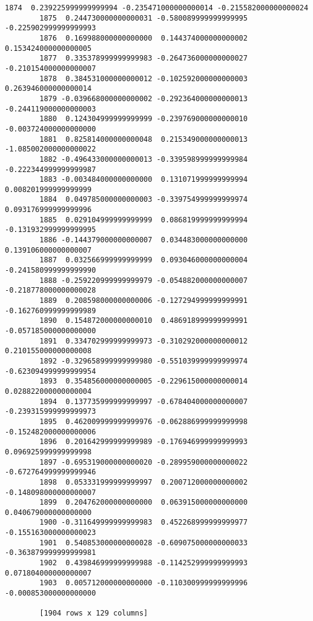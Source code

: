 \documentclass[11pt]{article}
\begin{document}
\begin{Verbatim}[commandchars=\\\{\}]
        1874  0.239225999999999994 -0.235471000000000014 -0.215582000000000024  
        1875  0.244730000000000031 -0.580089999999999995 -0.225902999999999993  
        1876  0.169988000000000000  0.144374000000000002  0.153424000000000005  
        1877  0.335378999999999983 -0.264736000000000027 -0.210154000000000007  
        1878  0.384531000000000012 -0.102592000000000003  0.263946000000000014  
        1879 -0.039668000000000002 -0.292364000000000013 -0.244119000000000003  
        1880  0.124304999999999999 -0.239769000000000010 -0.003724000000000000  
        1881  0.825814000000000048  0.215349000000000013 -1.085002000000000022  
        1882 -0.496433000000000013 -0.339598999999999984 -0.222344999999999987  
        1883 -0.003484000000000000  0.131071999999999994  0.008201999999999999  
        1884  0.049785000000000003 -0.339754999999999974  0.093176999999999996  
        1885  0.029104999999999999  0.086819999999999994 -0.131932999999999995  
        1886 -0.144379000000000007  0.034483000000000000  0.139106000000000007  
        1887  0.032566999999999999  0.093046000000000004 -0.241580999999999990  
        1888 -0.259220999999999979 -0.054882000000000007 -0.218778000000000028  
        1889  0.208598000000000006 -0.127294999999999991 -0.162760999999999989  
        1890  0.154872000000000010  0.486918999999999991 -0.057185000000000000  
        1891  0.334702999999999973 -0.310292000000000012  0.210155000000000008  
        1892 -0.329658999999999980 -0.551039999999999974 -0.623094999999999954  
        1893  0.354856000000000005 -0.229615000000000014  0.028822000000000004  
        1894  0.137735999999999997 -0.678404000000000007 -0.239315999999999973  
        1895  0.462009999999999976 -0.062886999999999998 -0.152482000000000006  
        1896  0.201642999999999989 -0.176946999999999993  0.096925999999999998  
        1897 -0.695319000000000020 -0.289959000000000022 -0.672764999999999946  
        1898  0.053331999999999997  0.200712000000000002 -0.148098000000000007  
        1899  0.204762000000000000  0.063915000000000000  0.040679000000000000  
        1900 -0.311649999999999983  0.452268999999999977 -0.155163000000000023  
        1901  0.540853000000000028 -0.609075000000000033 -0.363879999999999981  
        1902  0.439846999999999988 -0.114252999999999993  0.071804000000000007  
        1903  0.005712000000000000 -0.110300999999999996 -0.000853000000000000  
        
        [1904 rows x 129 columns]
\end{Verbatim}
            
\end{document}
